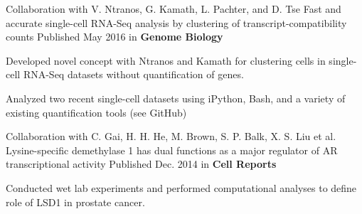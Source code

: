 \begin{cventries}
  \cventryedu
    {Collaboration with V. Ntranos, G. Kamath, L. Pachter, and D. Tse} %
    {Fast and accurate single-cell RNA-Seq analysis by clustering of transcript-compatibility counts} %
    {Published May 2016 in \textbf{Genome Biology}} %
    {
      \begin{cvitems} %
        \item {Developed novel concept with Ntranos and Kamath for clustering cells in single-cell RNA-Seq datasets without quantification of genes.}
        \item {Analyzed two recent single-cell datasets using iPython, Bash, and a variety of existing quantification tools (see GitHub)}
      \end{cvitems}
    }
    
  \vspace{-2mm}
  \cventryedu
    {Collaboration with C. Gai, H. H. He, M. Brown, S. P. Balk, X. S. Liu et al.} %
    {Lysine-specific demethylase 1 has dual functions as a major regulator of AR transcriptional activity} %
    {Published Dec. 2014 in \textbf{Cell Reports}} %
    {
      \begin{cvitems} %
        \item {Conducted wet lab experiments and performed computational analyses to define role of LSD1 in prostate cancer.}
      \end{cvitems}
    }
\end{cventries}
